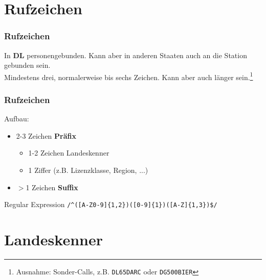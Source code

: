 %
%

\section{Rufzeichen}

\begin{frame}
  \frametitle{Rufzeichen}

  In \textbf{DL} personengebunden. Kann aber in anderen Staaten auch an die Station
  gebunden sein. \\[1em]

  Mindestens drei, normalerweise bis sechs Zeichen. Kann aber auch länger
  sein.\footnote{\scriptsize Ausnahme: Sonder-Calls, z.B.
  \texttt{DL65DARC} oder \texttt{DG500BIER}}

\end{frame}

\begin{frame}[fragile]
  \frametitle{Rufzeichen}

  Aufbau:

  \begin{itemize}
    \item 2-3 Zeichen \textbf{Präfix}
      \begin{itemize}
        \item 1-2 Zeichen Landeskenner
        \item 1 Ziffer (z.B. Lizenzklasse, Region, ...)
      \end{itemize}
    \item $>$1 Zeichen \textbf{Suffix}
  \end{itemize}

  \pause

  \begin{block}{Regular Expression}
    \verb+/^([A-Z0-9]{1,2})([0-9]{1})([A-Z]{1,3})$/+
  \end{block}


\end{frame}

\section{Landeskenner}

